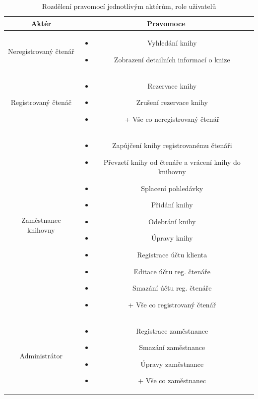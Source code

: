 \documentclass[11pt, a4paper, titlepage]{article}
\begin{document}
	\begin{table}[!h]
		\centering	
		\label{tab:pravomoce}	
		\begin{tabular}{| c | c |}	
		\hline
		\textbf{Aktér} & \textbf{Pravomoce}\\ 
		\hline	


		Neregistrovaný čtenář & 

		\parbox{.45\textwidth}{
		\begin{itemize}
		    \item Vyhledání knihy
		    \item Zobrazení detailních informací o knize
		\end{itemize}} 
		\\

		\hline

		Registrovaný čtenáč & 
		\parbox{.45\textwidth}{\begin{itemize}
		    \item Rezervace knihy
		    \item Zrušení rezervace knihy
		    \item + Vše co neregistrovaný čtenář
		\end{itemize}} 
		\\

		\hline
		
		Zaměstnanec knihovny & 
		\parbox{.45\textwidth}{\begin{itemize}
		    \item Zapůjčení knihy registrovanému čtenáři
		    \item Převzetí knihy od čtenáře a vrácení knihy do knihovny
		    \item Splacení pohledávky
		    \item Přidání knihy
		    \item Odebrání knihy
	            \item Úpravy knihy
		    \item Registrace účtu klienta
		    \item Editace účtu reg. čtenáře
		    \item Smazání účtu reg. čtenáře
	            \item + Vše co registrovaný čtenář
		\end{itemize}} 
		\\

		\hline

		Administrátor & 
		\parbox{.45\textwidth}{\begin{itemize}
		    \item Registrace zaměstnance
		    \item Smazání zaměstnance
		    \item Úpravy zaměstnance
	            \item + Vše co zaměstnanec
		\end{itemize}} 
		\\
		\hline
  		
		\end{tabular}
		\caption{Rozdělení pravomocí jednotlivým aktérům, role uživatelů}
	\end{table}
\end{document}
